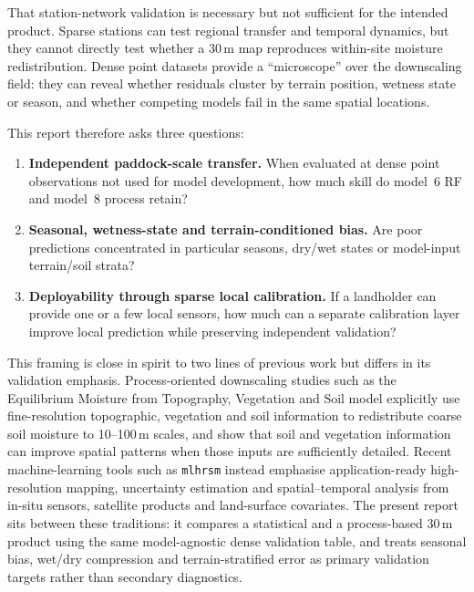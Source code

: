 \documentclass[11pt,a4paper]{article}
\newcommand{\modelSix}{model~6 RF}
\newcommand{\modelEight}{model~8 process}
\begin{document}
That station-network validation is necessary but not sufficient for the
intended product.  Sparse stations can test regional transfer and temporal
dynamics, but they cannot directly test whether a 30\,m map reproduces
within-site moisture redistribution.  Dense point datasets provide a
``microscope'' over the downscaling field: they can reveal whether residuals
cluster by terrain position, wetness state or season, and whether competing
models fail in the same spatial locations.

This report therefore asks three questions:

\begin{enumerate}
\item \textbf{Independent paddock-scale transfer.}  When evaluated at dense
  point observations not used for model development, how much skill do
  \modelSix{} and \modelEight{} retain?
\item \textbf{Seasonal, wetness-state and terrain-conditioned bias.}  Are poor
  predictions concentrated in particular seasons, dry/wet states or
  model-input terrain/soil strata?
\item \textbf{Deployability through sparse local calibration.}  If a landholder
  can provide one or a few local sensors, how much can a separate calibration
  layer improve local prediction while preserving independent validation?
\end{enumerate}

This framing is close in spirit to two lines of previous work but differs in
its validation emphasis.  Process-oriented downscaling studies such as the
Equilibrium Moisture from Topography, Vegetation and Soil model
\citep[EMT+VS;][]{ranney2015emtvs} explicitly use fine-resolution topographic,
vegetation and soil information to redistribute coarse soil moisture to
10--100\,m scales, and show that soil and vegetation information can improve
spatial patterns when those inputs are sufficiently detailed.  Recent
machine-learning tools such as \texttt{mlhrsm} \citep{peng2024mlhrsm} instead
emphasise application-ready high-resolution mapping, uncertainty estimation and
spatial--temporal analysis from in-situ sensors, satellite products and
land-surface covariates.  The present report sits between these traditions: it
compares a statistical and a process-based 30\,m product using the same
model-agnostic dense validation table, and treats seasonal bias, wet/dry
compression and terrain-stratified error as primary validation targets rather
than secondary diagnostics.
\end{document}
